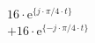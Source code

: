 \[
\begin{split}
&  16 \cdot \textrm{e}^{\{  j \cdot \pi/4 \cdot t \}}\\
&+ 16 \cdot \textrm{e}^{\{- j \cdot \pi/4 \cdot t \}}
\end{split}
\]

